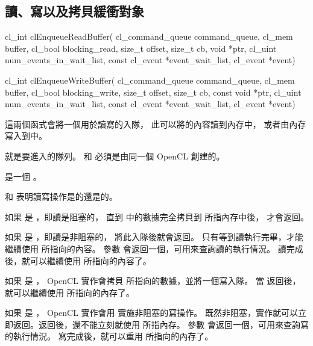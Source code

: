 \subsection{讀、寫以及拷貝緩衝對象}



\startCLFUNC
cl_int clEnqueueReadBuffer(
			cl_command_queue command_queue,
			cl_mem buffer,
			cl_bool blocking_read,
			size_t offset,
			size_t cb,
			void *ptr,
			cl_uint num_events_in_wait_list,
			const cl_event *event_wait_list,
			cl_event *event)

cl_int clEnqueueWriteBuffer(
			cl_command_queue command_queue,
			cl_mem buffer,
			cl_bool blocking_write,
			size_t offset,
			size_t cb,
			const void *ptr,
			cl_uint num_events_in_wait_list,
			const cl_event *event_wait_list,
			cl_event *event)
\stopCLFUNC

這兩個函式會將一個用於讀寫的入隊，
此可以將的內容讀到內存中，
或者由內存寫入到中。

 就是要進入的隊列。
 和  必須是由同一個 OpenCL 創建的。

 是一個 。

 和 
表明讀寫操作是{}的還是{}的。

如果  是 ，即讀是阻塞的，
直到  中的數據完全拷貝到  所指內存中後，
 才會返回。

如果  是 ，即讀是非阻塞的，
 將此入隊後就會返回。
只有等到讀執行完畢，才能繼續使用  所指向的內容。
參數  會返回一個，可用來查詢讀的執行情況。
讀完成後，就可以繼續使用  所指向的內容了。

如果  是 ，
OpenCL 實作會拷貝  所指向的數據，並將一個寫入隊。
當  返回後，
就可以繼續使用  所指向的內存了。

如果  是 ，
OpenCL 實作會用  實施非阻塞的寫操作。
既然非阻塞，實作就可以立即返回。返回後，還不能立刻就使用  所指內存。
參數  會返回一個，可用來查詢寫的執行情況。
寫完成後，就可以重用  所指向的內存了。


